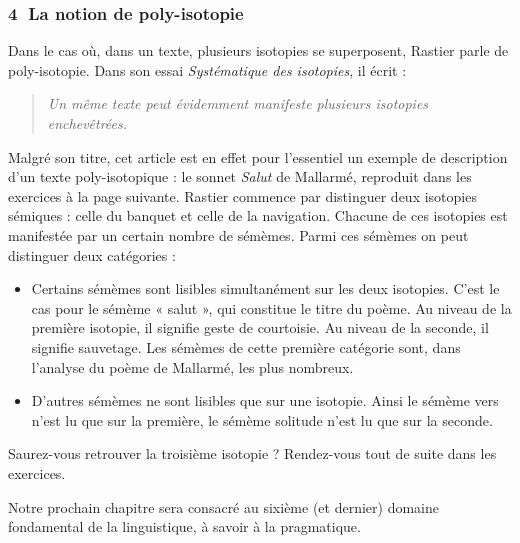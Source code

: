 \subsubsection*{\textcircled{\scriptsize 4} La notion de poly-isotopie}
Dans le cas où, dans un texte, plusieurs isotopies se superposent, Rastier parle de poly-isotopie. Dans son essai \textit{Systématique des isotopies}, il écrit :
\begin{quote}\small\itshape
Un même texte peut évidemment manifeste plusieurs isotopies enchevêtrées.
\end{quote}
Malgré son titre, cet article est en effet pour l’essentiel un exemple de description d’un texte poly-isotopique : le sonnet \textit{Salut} de Mallarmé, reproduit dans les exercices à la page suivante. Rastier commence par distinguer deux isotopies sémiques : celle du banquet et celle de la navigation. Chacune de ces isotopies est manifestée par un certain nombre de sémèmes. Parmi ces sémèmes on peut distinguer deux catégories :
\begin{itemize}
\item Certains sémèmes sont lisibles simultanément sur les deux isotopies. C’est le cas pour le sémème « salut », qui constitue le titre du poème. Au niveau de la première isotopie, il signifie geste de courtoisie. Au niveau de la seconde, il signifie sauvetage. Les sémèmes de cette première catégorie sont, dans l’analyse du poème de Mallarmé, les plus nombreux.
\item D’autres sémèmes ne sont lisibles que sur une isotopie. Ainsi le sémème vers n’est lu que sur la première, le sémème solitude n’est lu que sur la seconde.
\end{itemize}

Saurez-vous retrouver la troisième isotopie ? Rendez-vous tout de suite dans les exercices.

Notre prochain chapitre sera consacré au sixième (et dernier) domaine fondamental de la linguistique, à savoir à la pragmatique.

